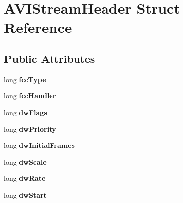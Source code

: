 \hypertarget{struct_a_v_i_stream_header}{\section{A\+V\+I\+Stream\+Header Struct Reference}
\label{struct_a_v_i_stream_header}
}
\subsection*{Public Attributes}
\begin{DoxyCompactItemize}
\item 
\hypertarget{struct_a_v_i_stream_header_ad49e00e446528688c667cbd8006f88af}{long {\bfseries fcc\+Type}}\label{struct_a_v_i_stream_header_ad49e00e446528688c667cbd8006f88af}

\item 
\hypertarget{struct_a_v_i_stream_header_a028d0102f931f10255e095e5d5af1012}{long {\bfseries fcc\+Handler}}\label{struct_a_v_i_stream_header_a028d0102f931f10255e095e5d5af1012}

\item 
\hypertarget{struct_a_v_i_stream_header_a3ef118dc5fd54fc3a9e7bb1eda8540bb}{long {\bfseries dw\+Flags}}\label{struct_a_v_i_stream_header_a3ef118dc5fd54fc3a9e7bb1eda8540bb}

\item 
\hypertarget{struct_a_v_i_stream_header_a58659d062b6585f9ecafcfa8884b24ca}{long {\bfseries dw\+Priority}}\label{struct_a_v_i_stream_header_a58659d062b6585f9ecafcfa8884b24ca}

\item 
\hypertarget{struct_a_v_i_stream_header_a222abbec1bc8398376e2a82aedc61ea3}{long {\bfseries dw\+Initial\+Frames}}\label{struct_a_v_i_stream_header_a222abbec1bc8398376e2a82aedc61ea3}

\item 
\hypertarget{struct_a_v_i_stream_header_a8f054a0b144f91765ac431c612309cd9}{long {\bfseries dw\+Scale}}\label{struct_a_v_i_stream_header_a8f054a0b144f91765ac431c612309cd9}

\item 
\hypertarget{struct_a_v_i_stream_header_ac004c591d819e13a28402158024be8e7}{long {\bfseries dw\+Rate}}\label{struct_a_v_i_stream_header_ac004c591d819e13a28402158024be8e7}

\item 
\hypertarget{struct_a_v_i_stream_header_a86482cd2673ac6e7c07cd880c5fac58e}{long {\bfseries dw\+Start}}\label{struct_a_v_i_stream_header_a86482cd2673ac6e7c07cd880c5fac58e}


\end{DoxyCompactItemize}
